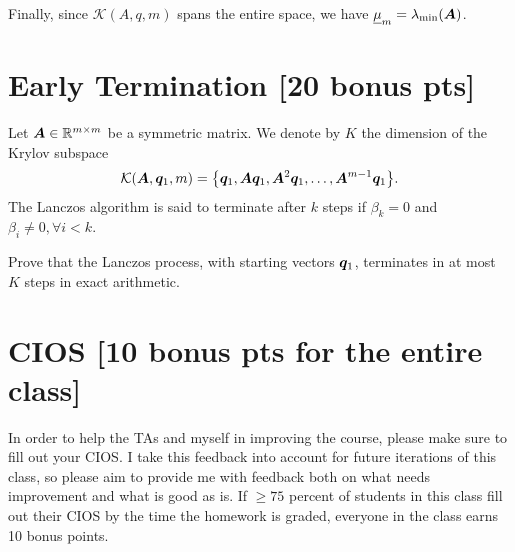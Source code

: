 \documentclass[twoside,10pt]{article}
\begin{document}
Finally, since $\mathcal{K}(A,q,m)$ spans the entire space, we have $\underline{\mu}_m = \lambda_{\min} \left(\mtx{A}\right)$.

\section{Early Termination [20 bonus pts]}
Let $\bm{A} \in \mathbb{R}^{m \times m}$ be a symmetric matrix. 
We denote by $K$ the dimension of the Krylov subspace 
\begin{equation}
  \mathcal{K}\left(\mtx{A}, \vct{q}_1, m\right) = \left\{\vct{q}_1, \mtx{A}\vct{q}_1, \mtx{A}^2 \vct{q}_1, \ldots, \mtx{A}^{m - 1} \vct{q}_1\right\}.
\end{equation}
The Lanczos algorithm is said to terminate after $k$ steps if $\beta_{k} = 0$ and $\beta_{i} \neq 0, \forall i < k$.

Prove that the Lanczos process, with starting vectors $\bm{q}_1$, terminates in at most $K$ steps in exact arithmetic. 

\section{CIOS [10 bonus pts for the entire class]}
  In order to help the TAs and myself in improving the course, please make sure to fill out your CIOS. 
  I take this feedback into account for future iterations of this class, so please aim to provide me with feedback both on what needs improvement and what is good as is. 
  If $\geq 75$ percent of students in this class fill out their CIOS by the time the homework is graded, everyone in the class earns 10 bonus points.
\end{document}
